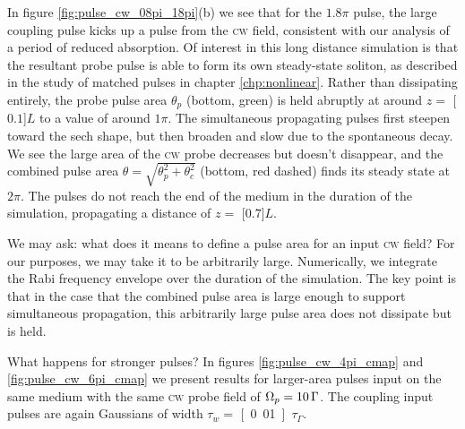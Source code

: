     In figure \ref{fig:pulse_cw_08pi_18pi}(b) we see that for the $1.8 \pi$
    pulse, the large coupling pulse kicks up a pulse from the \textsc{cw} field,
    consistent with our analysis of a period of reduced absorption. Of interest
    in this long distance simulation is that the resultant probe pulse is able
    to form its own steady-state soliton, as described in the study of matched
    pulses in chapter \ref{chp:nonlinear}. Rather than dissipating entirely, the
    probe pulse area $\theta_p$ (bottom, green) is held abruptly at around $z =
    $ \unit[$0.1$]{$L$} to a value of around $1 \pi$. The simultaneous
    propagating pulses first steepen toward the sech shape, but then broaden and
    slow due to the spontaneous decay. We see the large area of the \textsc{cw}
    probe decreases but doesn't disappear, and the combined pulse area $\theta =
    \sqrt{\theta_p^2 + \theta_c^2}$ (bottom, red dashed) finds its steady state at
    $2 \pi$. The pulses do not reach the end of the medium in the duration of the simulation, propagating a distance of $z = $ \unit[$0.7$]{$L$}.

    We may ask: what does it means to define a pulse area for an input
    \textsc{cw} field? For our purposes, we may take it to be arbitrarily large.
    Numerically, we integrate the Rabi frequency envelope over the duration of
    the simulation. The key point is that in the case that the combined pulse
    area is large enough to support simultaneous propagation, this arbitrarily
    large pulse area does not dissipate but is held.

    What happens for stronger pulses? In figures \ref{fig:pulse_cw_4pi_cmap} and
    \ref{fig:pulse_cw_6pi_cmap} we present results for larger-area pulses input
    on the same medium with the same \textsc{cw} probe field of $\Omega_p =
    \unit[10]{\Gamma}$. The coupling input pulses are again Gaussians of width
    $\tau_w = $ \unit[0.01]{$\tau_\Gamma$}.

